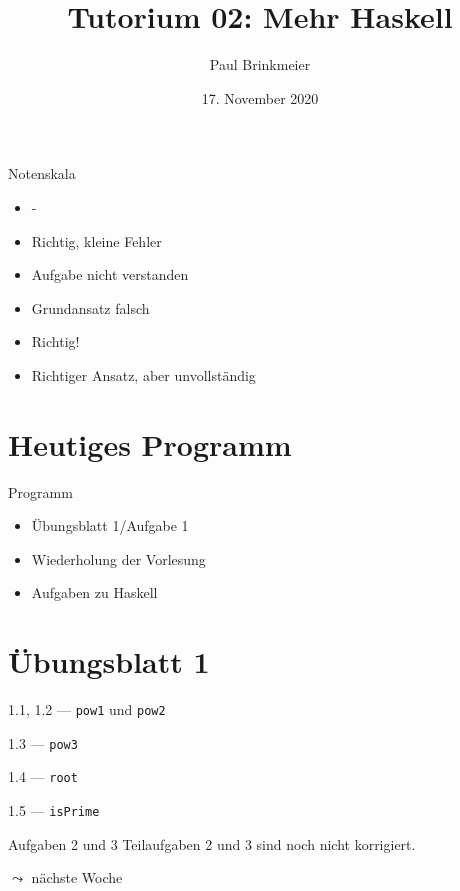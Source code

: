 \documentclass{beamer}
\title{Tutorium 02: Mehr Haskell}
\author{Paul Brinkmeier}
\institute{Tutorium Programmierparadigmen am KIT}
\date{17. November 2020}
\begin{document}
\begin{frame}
	\titlepage
\end{frame}

\begin{frame}{Notenskala}
	\begin{itemize}
		\item -
		\item Richtig, kleine Fehler
		\item Aufgabe nicht verstanden
		\item Grundansatz falsch
		\item Richtig!
		\item Richtiger Ansatz, aber unvollständig
	\end{itemize}
\end{frame}

\section{Heutiges Programm}
\begin{frame}{Programm}
	\begin{itemize}
		\item Übungsblatt 1/Aufgabe 1
		\item Wiederholung der Vorlesung
		\item Aufgaben zu Haskell
	\end{itemize}
\end{frame}

\section{Übungsblatt 1}

\begin{frame}{1.1, 1.2 --- \texttt{pow1} und \texttt{pow2}}
\end{frame}

\begin{frame}{1.3 --- \texttt{pow3}}
\end{frame}

\begin{frame}{1.4 --- \texttt{root}}
\end{frame}

\begin{frame}{1.5 --- \texttt{isPrime}}
\end{frame}

\begin{frame}{Aufgaben 2 und 3}
  Teilaufgaben 2 und 3 sind noch nicht korrigiert.

  $\leadsto$ nächste Woche
\end{frame}
\end{document}
